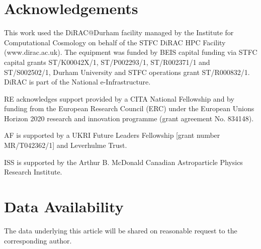 \documentclass[fleqn,usenatbib]{mnras}
\begin{document}
\section*{Acknowledgements}

This work used the DiRAC@Durham facility managed by the Institute for Computational Cosmology on behalf of the STFC DiRAC HPC Facility (www.dirac.ac.uk). The equipment was funded by BEIS capital funding via STFC capital grants ST/K00042X/1, ST/P002293/1, ST/R002371/1 and ST/S002502/1, Durham University and STFC operations grant ST/R000832/1. DiRAC is part of the National e-Infrastructure.

RE acknowledges support provided by a CITA National Fellowship and by funding from the European Research Council (ERC) under the European Unions Horizon 2020 research and innovation programme (grant agreement No. 834148).

AF is supported by a UKRI Future Leaders Fellowship [grant number MR/T042362/1] and Leverhulme Trust.

ISS is supported by the Arthur B. McDonald Canadian Astroparticle Physics Research Institute.

\section*{Data Availability}

The data underlying this article will be shared on reasonable request to the corresponding author.






\bsp	%
\label{lastpage}
\end{document}
